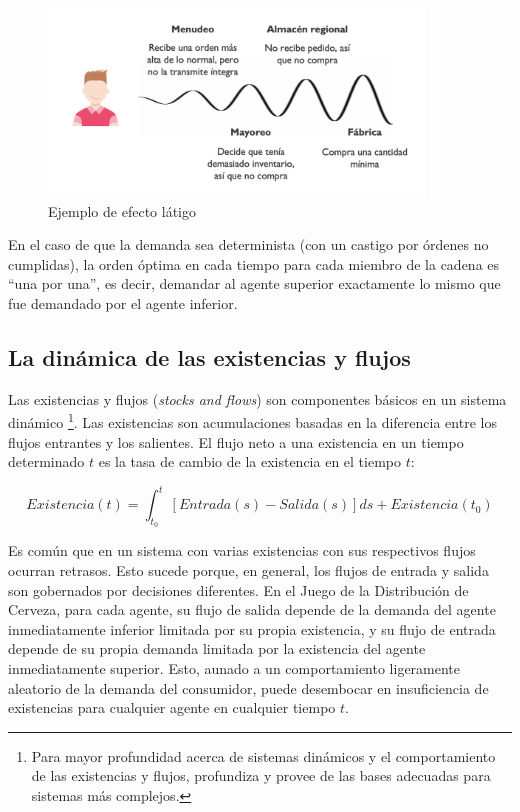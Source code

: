 \begin{figure}[ht]
\caption{Ejemplo de efecto l\'atigo}
\label{bullwhip_effect}
\includegraphics[width=10cm]{tesis_tex/figs/bullwhip_effect.PNG}
\centering
\end{figure}


En el caso de que la demanda sea determinista (con un castigo por \'ordenes no cumplidas), la orden \'optima en cada tiempo para cada miembro de la cadena es ``una por una'', es decir, demandar al agente superior exactamente lo mismo que fue demandado por el agente inferior.

\subsection{La din\'amica de las existencias y flujos}

Las existencias y flujos (\textit{stocks and flows}) son componentes b\'asicos en un sistema din\'amico \footnote{Para mayor profundidad acerca de sistemas din\'amicos y el comportamiento de las existencias y flujos, \citet{Sterman} profundiza y provee de las bases adecuadas para sistemas m\'as complejos.}. Las existencias son acumulaciones basadas en la diferencia entre los flujos entrantes y los salientes. El flujo neto a una existencia en un tiempo determinado $t$ es la tasa de cambio de la existencia en el tiempo $t$:

$$
Existencia(t) = \int_{t_{0}}^t [Entrada(s) - Salida(s)]ds + Existencia(t_{0}) 
$$

Es com\'un que en un sistema con varias existencias con sus respectivos flujos ocurran retrasos. Esto sucede porque, en general, los flujos de entrada y salida son gobernados por decisiones diferentes. En el Juego de la Distribuci\'on de Cerveza, para cada agente, su flujo de salida depende de la demanda del agente inmediatamente inferior limitada por su propia existencia, y su flujo de entrada depende de su propia demanda limitada por la existencia del agente inmediatamente superior. Esto, aunado a un comportamiento ligeramente aleatorio de la demanda del consumidor, puede desembocar en insuficiencia de existencias para cualquier agente en cualquier tiempo $t$. \\

